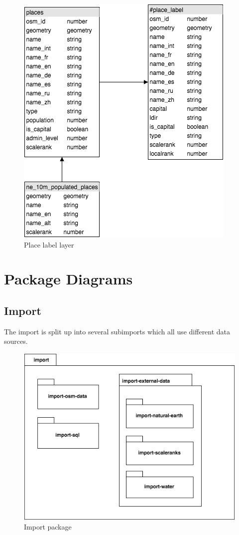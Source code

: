 \begin{figure}[h]
  \includegraphics[scale=0.6]{images/place_layer.png}
  \caption{Place label layer}
\end{figure}



\newpage
\section{Package Diagrams}

\subsection{Import}

The import is split up into several subimports which all use different data sources.

\begin{figure}[h]
  \includegraphics[scale=0.6]{images/import_package.png}
  \caption{Import package}
\end{figure}

